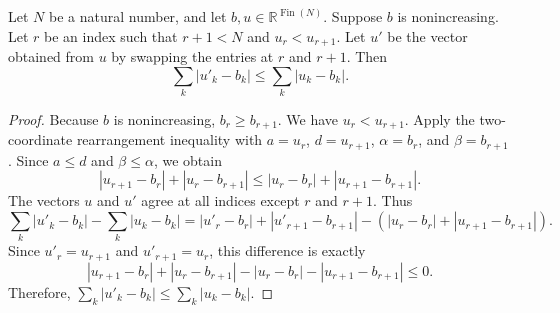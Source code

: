 \begin{helper}
Let \(N\) be a natural number, and let \(b, u \in \mathbb{R}^{\operatorname{Fin}(N)}\).
Suppose \(b\) is nonincreasing. Let \(r\) be an index such that \(r+1 < N\) and \(u_r < u_{r+1}\). Let \(u'\) be the vector obtained from \(u\) by swapping the entries at \(r\) and \(r+1\). Then
\[
\sum_{k} |u'_k - b_k| \le \sum_{k} |u_k - b_k|.
\]
\end{helper}
\begin{proof}
Because \(b\) is nonincreasing, \(b_r \ge b_{r+1}\). We have \(u_r < u_{r+1}\).
Apply the two-coordinate rearrangement inequality with \(a = u_r\), \(d = u_{r+1}\), \(\alpha = b_r\), and \(\beta = b_{r+1}\).
Since \(a \le d\) and \(\beta \le \alpha\), we obtain
\[
|u_{r+1} - b_r| + |u_r - b_{r+1}| \le |u_r - b_r| + |u_{r+1} - b_{r+1}|.
\]
The vectors \(u\) and \(u'\) agree at all indices except \(r\) and \(r+1\). Thus
\[
\sum_{k} |u'_k - b_k| - \sum_{k} |u_k - b_k| = |u'_r - b_r| + |u'_{r+1} - b_{r+1}| - (|u_r - b_r| + |u_{r+1} - b_{r+1}|).
\]
Since \(u'_r = u_{r+1}\) and \(u'_{r+1} = u_r\), this difference is exactly
\[
|u_{r+1} - b_r| + |u_r - b_{r+1}| - |u_r - b_r| - |u_{r+1} - b_{r+1}| \le 0.
\]
Therefore, \(\sum_k |u'_k - b_k| \le \sum_k |u_k - b_k|\).
\end{proof}
